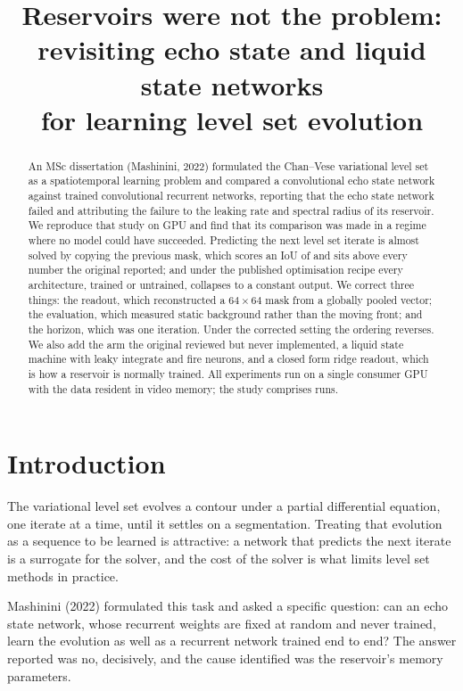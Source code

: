 \documentclass[11pt,a4paper]{article}
\title{Reservoirs were not the problem:\\
revisiting echo state and liquid state networks\\
for learning level set evolution}
\author{}
\date{}
\begin{document}
\maketitle

\begin{abstract}
An MSc dissertation (Mashinini, 2022) formulated the Chan--Vese variational
level set as a spatiotemporal learning problem and compared a convolutional
echo state network against trained convolutional recurrent networks, reporting
that the echo state network failed and attributing the failure to the leaking
rate and spectral radius of its reservoir. We reproduce that study on GPU and
find that its comparison was made in a regime where no model could have
succeeded. Predicting the next level set iterate is almost solved by copying
the previous mask, which scores an IoU of \Awsdcopyiou{} and sits above every
number the original reported; and under the published optimisation recipe every
architecture, trained or untrained, collapses to a constant output. We correct
three things: the readout, which reconstructed a $64 \times 64$ mask from a
globally pooled vector; the evaluation, which measured static background rather
than the moving front; and the horizon, which was one iteration. Under the
corrected setting the ordering reverses. We also add the arm the original
reviewed but never implemented, a liquid state machine with leaky integrate and
fire neurons, and a closed form ridge readout, which is how a reservoir is
normally trained. All experiments run on a single consumer GPU with the data
resident in video memory; the study comprises \totalruns{} runs.
\end{abstract}

\section{Introduction}

The variational level set evolves a contour under a partial differential
equation, one iterate at a time, until it settles on a segmentation. Treating
that evolution as a sequence to be learned is attractive: a network that
predicts the next iterate is a surrogate for the solver, and the cost of the
solver is what limits level set methods in practice.

Mashinini (2022) formulated this task and asked a specific question: can an
echo state network, whose recurrent weights are fixed at random and never
trained, learn the evolution as well as a recurrent network trained end to end?
The answer reported was no, decisively, and the cause identified was the
reservoir's memory parameters.
\end{document}
